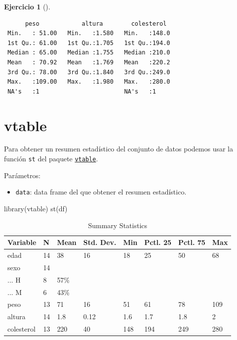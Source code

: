 \documentclass[
  spanish,
  a4paper,
]{scrreport}
\newenvironment{Shaded}{\begin{snugshade}}{\end{snugshade}}
\newcommand{\FunctionTok}[1]{\textcolor[rgb]{0.28,0.35,0.67}{#1}}
\newcommand{\NormalTok}[1]{\textcolor[rgb]{0.00,0.23,0.31}{#1}}
\providecommand{\tightlist}{%
  \setlength{\itemsep}{0pt}\setlength{\parskip}{0pt}}
\theoremstyle{definition}
\newtheorem{exercise}{Ejercicio}[chapter]
\theoremstyle{remark}
\begin{document}
\begin{exercise}[]
\begin{enumerate}
\begin{tcolorbox}
\begin{verbatim}
      peso            altura        colesterol   
 Min.   : 51.00   Min.   :1.580   Min.   :148.0  
 1st Qu.: 61.00   1st Qu.:1.705   1st Qu.:194.0  
 Median : 65.00   Median :1.755   Median :210.0  
 Mean   : 70.92   Mean   :1.769   Mean   :220.2  
 3rd Qu.: 78.00   3rd Qu.:1.840   3rd Qu.:249.0  
 Max.   :109.00   Max.   :1.980   Max.   :280.0  
 NA's   :1                        NA's   :1      
\end{verbatim}

  \section{vtable}

  Para obtener un resumen estadístico del conjunto de datos podemos usar
  la función \texttt{st} del paquete
  \href{https://cran.r-project.org/web/packages/vtable/vignettes/sumtable.html}{\texttt{vtable}}.

  Parámetros:

  \begin{itemize}
  \tightlist
  \item
    \texttt{data}: data frame del que obtener el resumen estadístico.
  \end{itemize}

\begin{Shaded}
\begin{Highlighting}[]
\FunctionTok{library}\NormalTok{(vtable)}
\FunctionTok{st}\NormalTok{(df)}
\end{Highlighting}
\end{Shaded}

  \begin{table}

  \caption{\label{tab:unnamed-chunk-46}Summary Statistics}
  \centering
  \begin{tabular}[t]{llllllll}
  \toprule
  Variable & N & Mean & Std. Dev. & Min & Pctl. 25 & Pctl. 75 & Max\\
  \midrule
  edad & 14 & 38 & 16 & 18 & 25 & 50 & 68\\
  sexo & 14 &  &  &  &  &  & \\
  ... H & 8 & 57\% &  &  &  &  & \\
  ... M & 6 & 43\% &  &  &  &  & \\
  peso & 13 & 71 & 16 & 51 & 61 & 78 & 109\\
  \addlinespace
  altura & 14 & 1.8 & 0.12 & 1.6 & 1.7 & 1.8 & 2\\
  colesterol & 13 & 220 & 40 & 148 & 194 & 249 & 280\\
  \bottomrule
  \end{tabular}
  \end{table}


\end{tcolorbox}
\end{enumerate}
\end{exercise}
\end{document}
